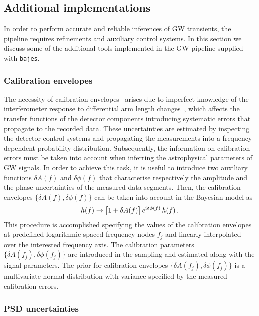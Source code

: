 \documentclass[prd,aps,twocolumn,a4paper,showkeys,nofootinbib,floatfix]{revtex4-1}
\newcommand{\be}{\begin{equation}}
\newcommand{\ee}{\end{equation}}
\def\i{{\rm i}}
\newcommand{\bajes}{{\tt bajes}}
\begin{document}
\subsection{Additional implementations} 
\label{sec:impl}

In order to perform accurate and reliable 
inferences of GW transients, the pipeline requires refinements
and auxiliary control systems. 
In this section we discuss some of the 
additional tools implemented in
the GW pipeline supplied with {\bajes}.

\subsubsection{Calibration envelopes} 
\label{sec:calib}

The necessity of calibration envelopes~\cite{Vitale:2011wu} arises due to 
imperfect knowledge of the interferometer response to differential arm length changes~\cite{Abbott:2016jsd,PhysRevD.96.102001,Acernese_2018},
which affects the transfer functions of the detector components
introducing systematic errors that propagate to the recorded data.
These uncertainties are estimated by inspecting the detector control systems
and propagating the measurements into a frequency-dependent probability distribution.
Subsequently, the information on calibration errors must be taken into account when inferring
the astrophysical parameters of GW signals.
In order to achieve this task, it is useful to introduce two auxiliary functions 
$\delta A(f)$ and $\delta \phi (f)$ that characterise respectively the amplitude 
and the phase uncertainties of the measured data segments.
Then, the calibration envelopes $\{\delta A(f),\delta \phi (f)\}$ can be 
taken into account in the Bayesian model as
\be
\label{eq:calib}
h(f) \to \big[1+\delta A(f)\big]\,e^{\i \delta\phi(f)}\,h(f)\,.
\ee
This procedure is accomplished 
specifying the values of the calibration envelopes at predefined logarithmic-spaced 
frequency nodes $f_j$ and linearly interpolated over the interested frequency axis.
The calibration parameters $\{\delta A(f_j),\delta \phi(f_j)\}$ are introduced in the sampling
and estimated along with the signal parameters. 
The prior for calibration envelopes $\{\delta A(f_j),\delta \phi(f_j)\}$ is a multivariate 
normal distribution with variance specified by the measured calibration errors. 

\subsubsection{PSD uncertainties} 
\label{sec:psderr}
\end{document}
